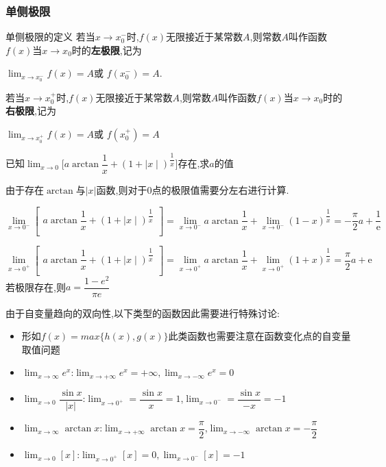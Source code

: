\documentclass[12pt, a4paper, oneside, UTF8]{ctexbook}
\begin{document}
\begin{sloppypar}
    \subsubsection{单侧极限}
    \begin{defn}{单侧极限的定义}{}
        若当$x\to x_0^{-}$时,$f(x)$无限接近于某常数$A$,则常数$A$叫作函数$f(x)$当$x\to x_0$时的\textbf{左极限},记为
        \begin{center}
            $\operatorname*{lim}_{x\to x_0^{-}}f(x)=A$或 $f(x_0^{-})=A$.
        \end{center}
        若当$x\to x_0^+$时,$f(x)$无限接近于某常数$A$,则常数$A$叫作函数$f(x)$当$x\to x_0$时的\textbf{右极限},记为
        \begin{center}
            $\operatorname*{lim}_{x\to x_0^{+}}f(x)=A$或 $f(x_0^{+})=A$
        \end{center}
    \end{defn}
    \begin{problem}
    $\text{已知}\lim_{x\to0}\biggl[a\arctan\dfrac{1}{x}+(1+\mid x\mid)^{\dfrac{1}{x}}\biggr]\text{存在,求}a\text{的值}$
    \end{problem}
    \begin{solution}
        由于存在$\arctan$与$|x|$函数,则对于0点的极限值需要分左右进行计算.

        $\lim\limits_{x\to0^{-}}\left[\begin{matrix}a\arctan\dfrac{1}{x}+(1+\mid x\mid)^{\dfrac{1}{x}}\\\end{matrix}\right]=\lim\limits_{x\to0^{-}}a\arctan\dfrac{1}{x}+\lim\limits_{x\to0^{-}}(1-x)^{\dfrac{1}{x}}=-\dfrac{\pi}{2}a+\dfrac{1}{\text{e}}$

        $\lim\limits_{x\to0^+}\left[\begin{matrix}a\arctan\dfrac{1}{x}+(1+\mid x\mid)^{\dfrac{1}{x}}\\\end{matrix}\right]=\lim\limits_{x\to0^+}a\arctan\dfrac{1}{x}+\lim\limits_{x\to0^+}(1+x)^{\dfrac{1}{x}}=\dfrac{\pi}{2}a+\mathrm{e}$
        若极限存在,则$a=\dfrac{1-e^2}{\pi e}$
    \end{solution}
    \begin{note}
        由于自变量趋向的双向性,以下类型的函数因此需要进行特殊讨论:
        \begin{itemize}
            \item 形如$f(x)=max\{h(x),g(x)\}$此类函数也需要注意在函数变化点的自变量取值问题
            \item $\lim_{x \to \infty}e^x$:$\lim _{x \to +\infty}e^x=+\infty,
                      \lim _{x \to -\infty}e^x=0$
            \item $\lim_{x \to 0} \dfrac{\sin x}{|x|}$:$\lim_{x \to 0^+}=\dfrac{\sin x}{x}=1$,$\lim_{x \to 0^-}=\dfrac{\sin x}{-x}=-1$
            \item $\lim_{x \to \infty }\arctan x$:$\lim_{x \to +\infty}\arctan x=\dfrac{\pi}{2}$,$\lim_{x \to -\infty}\arctan x= -\dfrac{\pi}{2}$
            \item $\lim_{x \to 0}[x]$:$\lim _{x \to 0^+}[x]=0,\lim_{x \to 0^-}[x]=-1$
        \end{itemize}
    \end{note}

\end{sloppypar}
\end{document}
